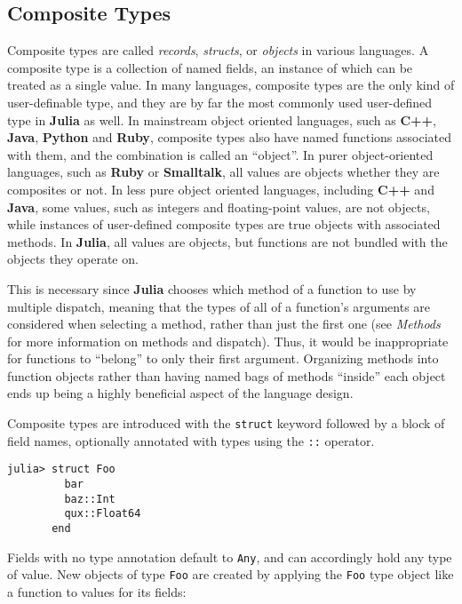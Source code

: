 \documentclass[
]{article}
\begin{document}
\hypertarget{composite-types}{%
\subsection{Composite Types}\label{composite-types}}

Composite types are called \emph{records}, \emph{structs}, or
\emph{objects} in various languages. A composite type is a collection of
named fields, an instance of which can be treated as a single value. In
many languages, composite types are the only kind of user-definable
type, and they are by far the most commonly used user-defined type in
\textbf{Julia} as well. In mainstream object oriented languages, such as
\textbf{C++}, \textbf{Java}, \textbf{Python} and \textbf{Ruby},
composite types also have named functions associated with them, and the
combination is called an ``object''. In purer object-oriented languages,
such as \textbf{Ruby} or \textbf{Smalltalk}, all values are objects
whether they are composites or not. In less pure object oriented
languages, including \textbf{C++} and \textbf{Java}, some values, such
as integers and floating-point values, are not objects, while instances
of user-defined composite types are true objects with associated
methods. In \textbf{Julia}, all values are objects, but functions are
not bundled with the objects they operate on.

This is necessary since \textbf{Julia} chooses which method of a
function to use by multiple dispatch, meaning that the types of all of a
function's arguments are considered when selecting a method, rather than
just the first one (see \emph{Methods} for more information on methods
and dispatch). Thus, it would be inappropriate for functions to
``belong'' to only their first argument. Organizing methods into
function objects rather than having named bags of methods ``inside''
each object ends up being a highly beneficial aspect of the language
design.

Composite types are introduced with the \texttt{struct} keyword followed
by a block of field names, optionally annotated with types using the
\texttt{::} operator.

\begin{verbatim}
julia> struct Foo
         bar
         baz::Int
         qux::Float64
       end
\end{verbatim}

Fields with no type annotation default to \texttt{Any}, and can
accordingly hold any type of value. New objects of type \texttt{Foo} are
created by applying the \texttt{Foo} type object like a function to
values for its fields:
\end{document}
